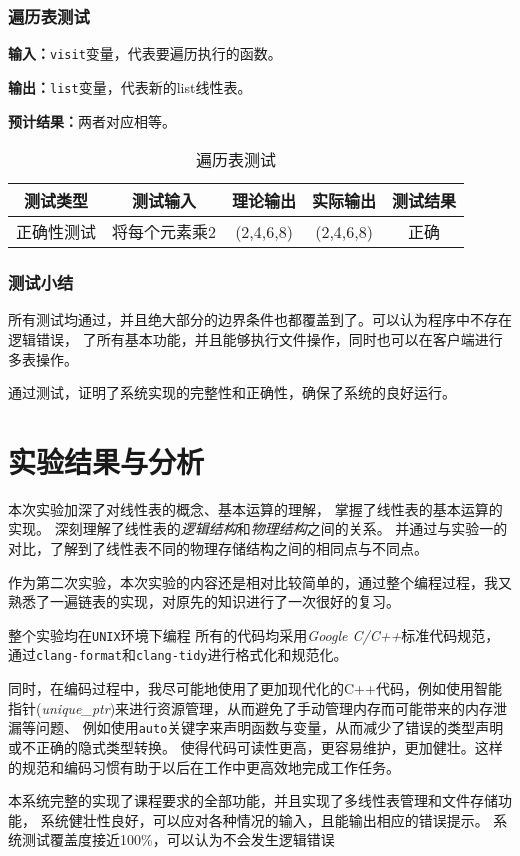 \subsubsection{遍历表测试}
\textbf{输入：}\texttt{visit}变量，代表要遍历执行的函数。
\par
\textbf{输出：}\texttt{list}变量，代表新的list线性表。
\par
\textbf{预计结果：}两者对应相等。
\begin{table}[h]
    \caption{遍历表测试}
    \centering
    \begin{tabular}{@{}ccccc@{}}
        \toprule
        \multicolumn{1}{c}{测试类型}    & \multicolumn{1}{c}{测试输入} & \multicolumn{1}{c}{理论输出} & \multicolumn{1}{c}{实际输出} &
        \multicolumn{1}{c}{测试结果} \\ \midrule
        \multicolumn{1}{c|}{正确性测试}  & 将每个元素乘2&(2,4,6,8)&(2,4,6,8)&正确\\ \bottomrule
    \end{tabular}
    \label{tab:traversetest2}
\end{table}

\subsubsection{测试小结}
所有测试均通过，并且绝大部分的边界条件也都覆盖到了。可以认为程序中不存在逻辑错误，
了所有基本功能，并且能够执行文件操作，同时也可以在客户端进行多表操作。
\par
通过测试，证明了系统实现的完整性和正确性，确保了系统的良好运行。

\section{实验结果与分析}\label{sec:test24}
本次实验加深了对线性表的概念、基本运算的理解，
掌握了线性表的基本运算的实现。
深刻理解了线性表的\emph{逻辑结构}和\emph{物理结构}之间的关系。
并通过与实验一的对比，了解到了线性表不同的物理存储结构之间的相同点与不同点。
\par
作为第二次实验，本次实验的内容还是相对比较简单的，通过整个编程过程，我又熟悉了一遍链表的实现，对原先的知识进行了一次很好的复习。
\par 整个实验均在\texttt{UNIX}环境下编程
所有的代码均采用\emph{Google C/C++}标准代码规范，
通过\texttt{clang-format}和\texttt{clang-tidy}进行格式化和规范化。
\par
同时，在编码过程中，我尽可能地使用了更加现代化的C++代码，例如使用智能指针(\textit{unique\_ptr})来进行资源管理，从而避免了手动管理内存而可能带来的内存泄漏等问题、
例如使用\texttt{auto}关键字来声明函数与变量，从而减少了错误的类型声明或不正确的隐式类型转换。
使得代码可读性更高，更容易维护，更加健壮。这样的规范和编码习惯有助于以后在工作中更高效地完成工作任务。
\par
本系统完整的实现了课程要求的全部功能，并且实现了多线性表管理和文件存储功能，
系统健壮性良好，可以应对各种情况的输入，且能输出相应的错误提示。
系统测试覆盖度接近100\%，可以认为不会发生逻辑错误
\par

